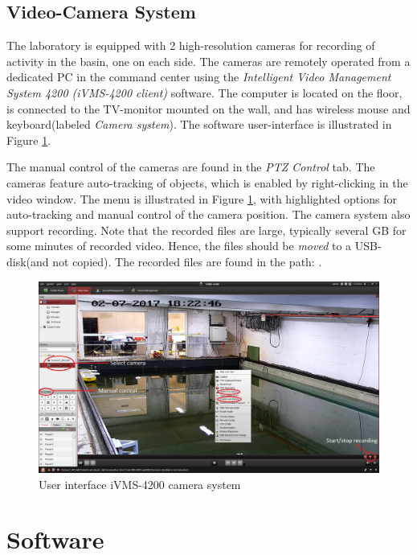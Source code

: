 \documentclass[a4paper,english]{report}
\begin{document}
\section{Video-Camera System}
The laboratory is equipped with 2 high-resolution cameras for recording of activity in the basin, one on each side. The cameras are remotely operated from a dedicated PC in the command center using the \textit{Intelligent Video Management System 4200 (iVMS-4200 client)} software. The computer is located on the floor, is connected to the TV-monitor mounted on the wall, and has wireless mouse and keyboard(labeled \textit{Camera system}). The software user-interface is illustrated in Figure \ref{fig:userinterface_iVMS-4200}. 

The manual control of the cameras are found in the \textit{PTZ Control} tab. The cameras feature auto-tracking of objects, which is enabled by right-clicking in the video window. The menu is illustrated in Figure \ref{fig:userinterface_iVMS-4200}, with highlighted options for auto-tracking and manual control of the camera position. 
The camera system also support recording. Note that the recorded files are large, typically several GB for some minutes of recorded video. Hence, the files should be \textit{moved} to a USB-disk(and not copied). The recorded files are found in the path: .
\begin{figure}[htb!]
	\centerline{\includegraphics[width=1.4\linewidth]{fig/Camera_userinterface.png}}
	\caption{User interface iVMS-4200 camera system}
	\label{fig:userinterface_iVMS-4200}
\end{figure}

\chapter{Software}\label{ch:software}
\end{document}
